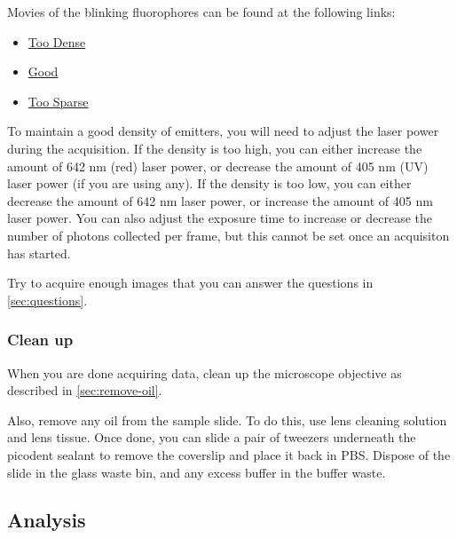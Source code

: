 \documentclass[10pt,a4paper,oneside]{book}
\begin{document}
Movies of the blinking fluorophores can be found at the following links:

\begin{itemize}
    \item \href{https://drive.google.com/file/d/12zIK-BqMl0qttkYljKi7P9xZ3krMvthe/view?usp=sharing}{Too Dense}
    \item \href{https://drive.google.com/file/d/1Is4U-K297sku4u20OJqwY6IOUags1bLl/view?usp=sharing}{Good}
    \item \href{https://drive.google.com/file/d/1W2AxVjYirPj8t8d2__m8rNoNTUyM3RfY/view?usp=sharing}{Too Sparse}
\end{itemize}

To maintain a good density of emitters, you will need to adjust the laser power during the acquisition. If the density is too high, you can either increase the amount of 642 nm (red) laser power, or decrease the amount of 405 nm (UV) laser power (if you are using any). If the density is too low, you can either decrease the amount of 642 nm laser power, or increase the amount of 405 nm laser power. You can also adjust the exposure time to increase or decrease the number of photons collected per frame, but this cannot be set once an acquisiton has started.

Try to acquire enough images that you can answer the questions in \autoref{sec:questions}.

\subsubsection{Clean up}

\newline

When you are done acquiring data, clean up the microscope objective as described in \autoref{sec:remove-oil}.

Also, remove any oil from the sample slide. To do this, use lens cleaning solution and lens tissue. Once done, you can slide a pair of tweezers underneath the picodent sealant to remove the coverslip and place it back in PBS. Dispose of the slide in the glass waste bin, and any excess buffer in the buffer waste.

\subsection{Analysis}
\end{document}
